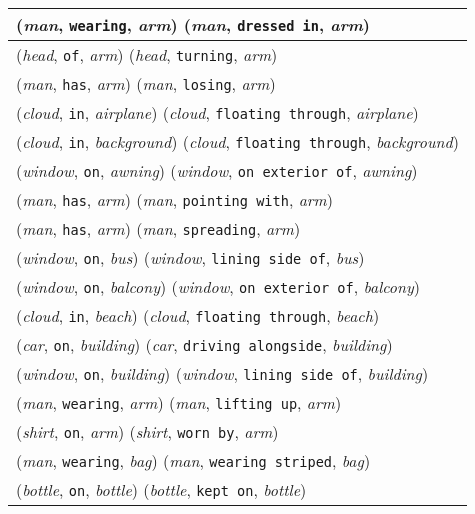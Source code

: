 \documentclass[runningheads]{llncs}
\begin{document}
{\begin{longtable}{ l }
(\textit{man}, \texttt{wearing}, \textit{arm})  (\textit{man}, \texttt{dressed in}, \textit{arm}) \\ \hline
(\textit{head}, \texttt{of}, \textit{arm})  (\textit{head}, \texttt{turning}, \textit{arm}) \\ \hline
(\textit{man}, \texttt{has}, \textit{arm})  (\textit{man}, \texttt{losing}, \textit{arm}) \\ \hline
(\textit{cloud}, \texttt{in}, \textit{airplane})  (\textit{cloud}, \texttt{floating through}, \textit{airplane}) \\ \hline
(\textit{cloud}, \texttt{in}, \textit{background})  (\textit{cloud}, \texttt{floating through}, \textit{background}) \\ \hline
(\textit{window}, \texttt{on}, \textit{awning})  (\textit{window}, \texttt{on exterior of}, \textit{awning}) \\ \hline
(\textit{man}, \texttt{has}, \textit{arm})  (\textit{man}, \texttt{pointing with}, \textit{arm}) \\ \hline
(\textit{man}, \texttt{has}, \textit{arm})  (\textit{man}, \texttt{spreading}, \textit{arm}) \\ \hline
(\textit{window}, \texttt{on}, \textit{bus})  (\textit{window}, \texttt{lining side of}, \textit{bus}) \\ \hline
(\textit{window}, \texttt{on}, \textit{balcony})  (\textit{window}, \texttt{on exterior of}, \textit{balcony}) \\ \hline
(\textit{cloud}, \texttt{in}, \textit{beach})  (\textit{cloud}, \texttt{floating through}, \textit{beach}) \\ \hline
(\textit{car}, \texttt{on}, \textit{building})  (\textit{car}, \texttt{driving alongside}, \textit{building}) \\ \hline
(\textit{window}, \texttt{on}, \textit{building})  (\textit{window}, \texttt{lining side of}, \textit{building}) \\ \hline
(\textit{man}, \texttt{wearing}, \textit{arm})  (\textit{man}, \texttt{lifting up}, \textit{arm}) \\ \hline
(\textit{shirt}, \texttt{on}, \textit{arm})  (\textit{shirt}, \texttt{worn by}, \textit{arm}) \\ \hline
(\textit{man}, \texttt{wearing}, \textit{bag})  (\textit{man}, \texttt{wearing striped}, \textit{bag}) \\ \hline
(\textit{bottle}, \texttt{on}, \textit{bottle})  (\textit{bottle}, \texttt{kept on}, \textit{bottle}) \\ \hline

\end{longtable}}
\end{document}
